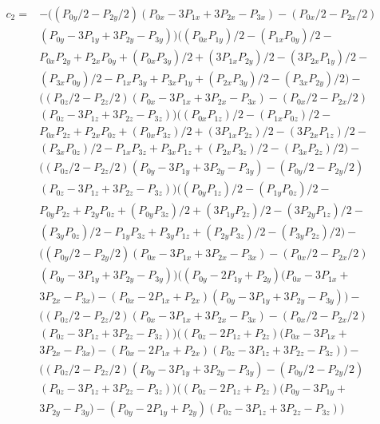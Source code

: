 \documentclass{article}
\begin{document}
\begin{equation}
\begin{aligned}
c_2 =& - \big((P_{0y}/2 - P_{2y}/2)(P_{0x} - 3P_{1x} + 3P_{2x} - P_{3x}) - (P_{0x}/2 - P_{2x}/2)\\
     & (P_{0y} - 3P_{1y} + 3P_{2y} - P_{3y})\big)\big((P_{0x}P_{1y})/2 - (P_{1x}P_{0y})/2 - \\
     & P_{0x}P_{2y} + P_{2x}P_{0y} + (P_{0x}P_{3y})/2 + (3P_{1x}P_{2y})/2 - (3P_{2x}P_{1y})/2 - \\
     & (P_{3x}P_{0y})/2 - P_{1x}P_{3y} + P_{3x}P_{1y} + (P_{2x}P_{3y})/2 - (P_{3x}P_{2y})/2\big) - \\ & \big((P_{0z}/2 - P_{2z}/2)(P_{0x} - 3P_{1x} + 3P_{2x} - P_{3x}) - (P_{0x}/2 - P_{2x}/2) \\ 
     & (P_{0z} - 3P_{1z} + 3P_{2z} - P_{3z})\big)\big((P_{0x}P_{1z})/2 - (P_{1x}P_{0z})/2 - \\
     & P_{0x}P_{2z} + P_{2x}P_{0z} + (P_{0x}P_{3z})/2 + (3P_{1x}P_{2z})/2 - (3P_{2x}P_{1z})/2 - \\
     & (P_{3x}P_{0z})/2 - P_{1x}P_{3z} + P_{3x}P_{1z} + (P_{2x}P_{3z})/2 - (P_{3x}P_{2z})/2\big) - \\ & \big((P_{0z}/2 - P_{2z}/2)(P_{0y} - 3P_{1y} + 3P_{2y} - P_{3y}) - (P_{0y}/2 - P_{2y}/2)\\
     & (P_{0z} - 3P_{1z} + 3P_{2z} - P_{3z})\big)\big((P_{0y}P_{1z})/2 - (P_{1y}P_{0z})/2 - \\
     & P_{0y}P_{2z} + P_{2y}P_{0z} + (P_{0y}P_{3z})/2 + (3P_{1y}P_{2z})/2 - (3P_{2y}P_{1z})/2 - \\
     & (P_{3y}P_{0z})/2 - P_{1y}P_{3z} + P_{3y}P_{1z} + (P_{2y}P_{3z})/2 - (P_{3y}P_{2z})/2\big) - \\ & \big((P_{0y}/2 - P_{2y}/2)(P_{0x} - 3P_{1x} + 3P_{2x} - P_{3x}) - (P_{0x}/2 - P_{2x}/2) \\
     & (P_{0y} - 3P_{1y} + 3P_{2y} - P_{3y})\big)\big((P_{0y} - 2P_{1y} + P_{2y})(P_{0x} - 3P_{1x} + \\ 
     & 3P_{2x} - P_{3x}) - (P_{0x} - 2P_{1x} + P_{2x})(P_{0y} - 3P_{1y} + 3P_{2y} - P_{3y})\big) - \\
     &\big((P_{0z}/2 - P_{2z}/2)(P_{0x} - 3P_{1x} + 3P_{2x} - P_{3x}) - (P_{0x}/2 - P_{2x}/2)\\
     & (P_{0z} - 3P_{1z} + 3P_{2z} - P_{3z})\big)\big((P_{0z} - 2P_{1z} + P_{2z})(P_{0x} - 3P_{1x} + \\ 
     & 3P_{2x} - P_{3x}) - (P_{0x} - 2P_{1x} + P_{2x})(P_{0z} - 3P_{1z} + 3P_{2z} - P_{3z})\big) - \\ & \big((P_{0z}/2 - P_{2z}/2)(P_{0y} - 3P_{1y} + 3P_{2y} - P_{3y}) - (P_{0y}/2 - P_{2y}/2) \\
     & (P_{0z} - 3P_{1z} + 3P_{2z} - P_{3z})\big)\big((P_{0z} - 2P_{1z} + P_{2z})(P_{0y} - 3P_{1y} + \\ 
     & 3P_{2y} - P_{3y}) - (P_{0y} - 2P_{1y} + P_{2y})(P_{0z} - 3P_{1z} + 3P_{2z} - P_{3z})\big)
\end{aligned}
\end{equation}
\end{document}
